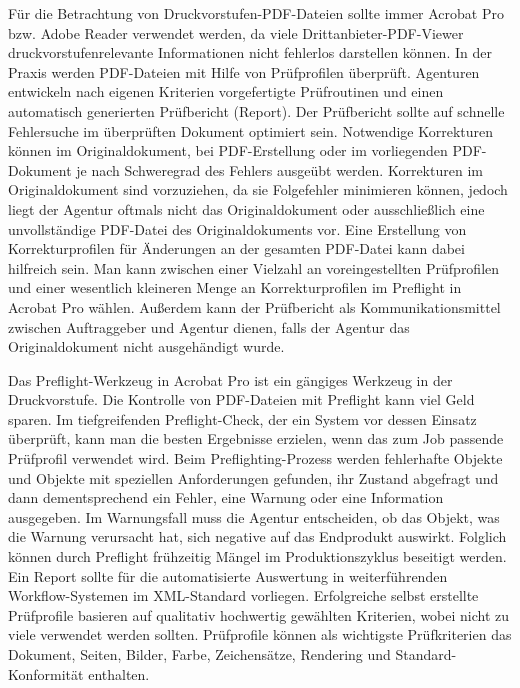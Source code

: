 Für die Betrachtung von Druckvorstufen-PDF-Dateien sollte immer Acrobat Pro bzw. Adobe Reader verwendet werden, da viele Drittanbieter-PDF-Viewer druckvorstufenrelevante Informationen nicht fehlerlos darstellen können. In der Praxis werden PDF-Dateien mit Hilfe von Prüfprofilen überprüft. Agenturen entwickeln nach eigenen Kriterien vorgefertigte Prüfroutinen und einen automatisch generierten Prüfbericht (Report). Der Prüfbericht sollte auf schnelle Fehlersuche im überprüften Dokument optimiert sein. Notwendige Korrekturen können im Originaldokument, bei PDF-Erstellung oder im vorliegenden PDF-Dokument je nach Schweregrad des Fehlers ausgeübt werden. Korrekturen im Originaldokument sind vorzuziehen, da sie Folgefehler minimieren können, jedoch liegt der Agentur oftmals nicht das Originaldokument oder ausschließlich eine unvollständige PDF-Datei des Originaldokuments vor. Eine Erstellung von Korrekturprofilen für Änderungen an der gesamten PDF-Datei kann dabei hilfreich sein. Man kann zwischen einer Vielzahl an voreingestellten Prüfprofilen und einer wesentlich kleineren Menge an Korrekturprofilen im Preflight in Acrobat Pro wählen. Außerdem kann der Prüfbericht als Kommunikationsmittel zwischen Auftraggeber und Agentur dienen, falls der Agentur das Originaldokument nicht ausgehändigt wurde. 
\par
Das Preflight-Werkzeug in Acrobat Pro ist ein gängiges Werkzeug in der Druckvorstufe. Die Kontrolle von PDF-Dateien mit Preflight kann viel Geld sparen. Im tiefgreifenden Preflight-Check, der ein System vor dessen Einsatz überprüft, kann man die besten Ergebnisse erzielen, wenn das zum Job passende Prüfprofil verwendet wird. Beim Preflighting-Prozess werden fehlerhafte Objekte und Objekte mit speziellen Anforderungen gefunden, ihr Zustand abgefragt und dann dementsprechend ein Fehler, eine Warnung oder eine Information ausgegeben. Im Warnungsfall muss die Agentur entscheiden, ob das Objekt, was die Warnung verursacht hat, sich negative auf das Endprodukt auswirkt. Folglich können durch Preflight frühzeitig Mängel im Produktionszyklus beseitigt werden. Ein Report sollte für die automatisierte Auswertung in weiterführenden Workflow-Systemen im XML-Standard vorliegen. Erfolgreiche selbst erstellte Prüfprofile basieren auf qualitativ hochwertig gewählten Kriterien, wobei nicht zu viele verwendet werden sollten. Prüfprofile können als wichtigste Prüfkriterien das Dokument, Seiten, Bilder, Farbe, Zeichensätze, Rendering und Standard-Konformität enthalten.
\par
